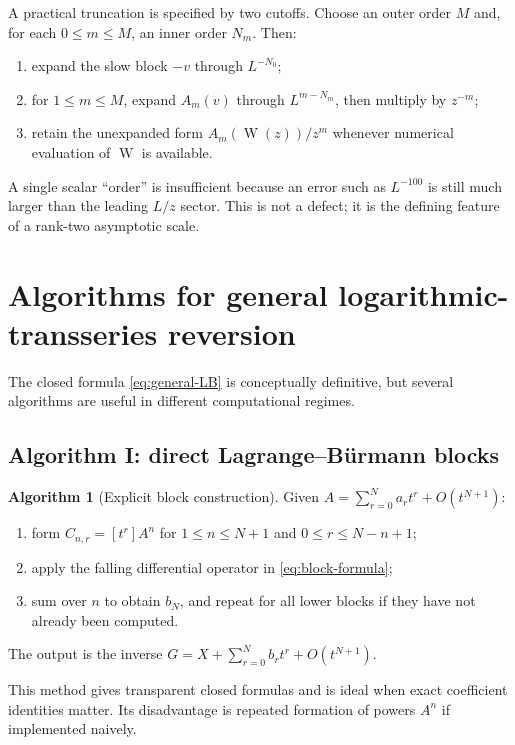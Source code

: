 \documentclass[11pt,oneside]{article}
\theoremstyle{plain}
\theoremstyle{definition}
\newtheorem{algorithm}[theorem]{Algorithm}
\theoremstyle{remark}
\newcommand{\W}{\operatorname{W}}
\begin{document}
A practical truncation is specified by two cutoffs.  Choose an outer order
\(M\) and, for each \(0\le m\le M\), an inner order \(N_m\).  Then:
\begin{enumerate}
\item expand the slow block \(-v\) through \(L^{-N_0}\);
\item for \(1\le m\le M\), expand \(A_m(v)\) through
      \(L^{m-N_m}\), then multiply by \(z^{-m}\);
\item retain the unexpanded form \(A_m(\W(z))/z^m\) whenever numerical
      evaluation of \(\W\) is available.
\end{enumerate}
A single scalar ``order'' is insufficient because an error such as
\(L^{-100}\) is still much larger than the leading \(L/z\) sector.  This is
not a defect; it is the defining feature of a rank-two asymptotic scale.

\section{Algorithms for general logarithmic-transseries reversion}
\label{sec:algorithms}

The closed formula \eqref{eq:general-LB} is conceptually definitive, but
several algorithms are useful in different computational regimes.

\subsection{Algorithm I: direct Lagrange--B\"urmann blocks}

\begin{algorithm}[Explicit block construction]
\label{alg:LB-block}
Given \(A=\sum_{r=0}^{N}a_rt^r+O(t^{N+1})\):
\begin{enumerate}
\item form \(C_{n,r}=[t^r]A^n\) for \(1\le n\le N+1\) and
      \(0\le r\le N-n+1\);
\item apply the falling differential operator in \eqref{eq:block-formula};
\item sum over \(n\) to obtain \(b_N\), and repeat for all lower blocks if
      they have not already been computed.
\end{enumerate}
The output is the inverse \(G=X+\sum_{r=0}^{N}b_rt^r+O(t^{N+1})\).
\end{algorithm}

This method gives transparent closed formulas and is ideal when exact
coefficient identities matter.  Its disadvantage is repeated formation of
powers \(A^n\) if implemented naively.
\end{document}
